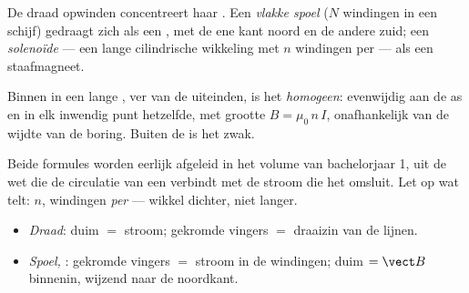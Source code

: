 \begin{definition}\label{def:g11:magnetic-fields:solenoid}
De draad opwinden concentreert haar . Een \emph{vlakke
spoel} ($N$ windingen in een schijf) gedraagt zich
als een  , met de ene kant noord en de andere zuid; een
\emph{solenoïde} --- een lange cilindrische wikkeling
met $n$ windingen per  --- als een staafmagneet.
\end{definition}

\begin{proposition}\label{prop:g11:magnetic-fields:solenoidfield}
Binnen in een lange , ver van de uiteinden, is het 
\emph{homogeen}: evenwijdig aan de as en in elk inwendig punt hetzelfde,
met grootte $B = \mu_0\, n\, I$, onafhankelijk van de wijdte van de
boring. Buiten de  is het  zwak.
\end{proposition}
\admitted

\begin{remark}
Beide formules worden eerlijk afgeleid in het volume van bachelorjaar 1,
uit de wet die de circulatie van een  verbindt met de stroom die het
omsluit. Let op wat telt: $n$, windingen \emph{per } --- wikkel
dichter, niet langer.
\end{remark}

\begin{method}\label{met:g11:magnetic-fields:righthand}
\begin{itemize}
  \item \emph{Draad}: duim $=$ stroom; gekromde vingers $=$ draaizin van
        de lijnen.
  \item \emph{Spoel, }: gekromde vingers $=$ stroom in de
        windingen; duim $= \vect B$ binnenin, wijzend naar de noordkant.
\end{itemize}
\end{method}

